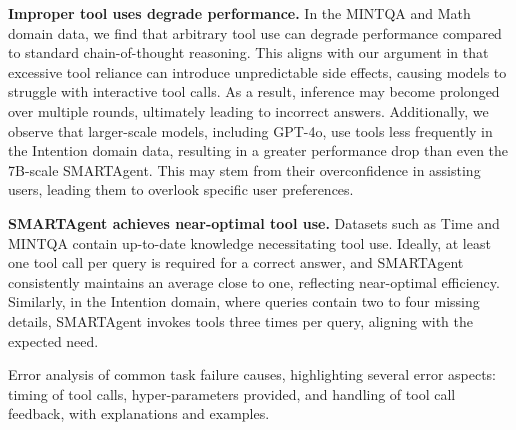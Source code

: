 \vspace{1.5mm}
\noindent\textbf{Improper tool uses degrade performance.}  
In the MINTQA and Math domain data, we find that arbitrary tool use can degrade performance compared to standard chain-of-thought reasoning. This aligns with our argument in  that excessive tool reliance can introduce unpredictable side effects, causing models to struggle with interactive tool calls. As a result, inference may become prolonged over multiple rounds, ultimately leading to incorrect answers. Additionally, we observe that larger-scale models, including GPT-4o, use tools less frequently in the Intention domain data, resulting in a greater performance drop than even the 7B-scale SMARTAgent. This may stem from their overconfidence in assisting users, leading them to overlook specific user preferences.

\vspace{1.5mm}
\noindent\textbf{SMARTAgent achieves near-optimal tool use.}
Datasets such as Time and MINTQA contain up-to-date knowledge necessitating tool use. Ideally, at least one tool call per query is required for a correct answer, and SMARTAgent consistently maintains an average close to one, reflecting near-optimal efficiency. Similarly, in the Intention domain, where queries contain two to four missing details, SMARTAgent invokes tools three times per query, aligning with the expected need.

\begin{table*}[!t]
    \centering
    \caption{Error analysis of common task failure causes, highlighting several error aspects: timing of tool calls, hyper-parameters provided, and handling of tool call feedback, with explanations and examples.}
    \label{tab:analysis_error}
\end{table*}


